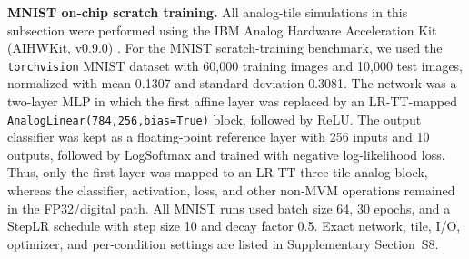 \documentclass[fleqn,10pt]{wlscirep}
\begin{document}
\noindent\textbf{MNIST on-chip scratch training.}
All analog-tile simulations in this subsection were performed using the IBM Analog Hardware Acceleration Kit (AIHWKit, v0.9.0) \cite{rasch2021aihwkit,legallo2023aihwkit}.
For the MNIST scratch-training benchmark, we used the \texttt{torchvision} MNIST dataset with 60,000 training images and 10,000 test images, normalized with mean 0.1307 and standard deviation 0.3081.
The network was a two-layer MLP in which the first affine layer was replaced by an LR-TT-mapped \texttt{AnalogLinear(784,256,bias=True)} block, followed by ReLU.
The output classifier was kept as a floating-point reference layer with 256 inputs and 10 outputs, followed by LogSoftmax and trained with negative log-likelihood loss.
Thus, only the first layer was mapped to an LR-TT three-tile analog block, whereas the classifier, activation, loss, and other non-MVM operations remained in the FP32/digital path.
All MNIST runs used batch size 64, 30 epochs, and a StepLR schedule with step size 10 and decay factor 0.5.
Exact network, tile, I/O, optimizer, and per-condition settings are listed in Supplementary Section~S8.
\end{document}
